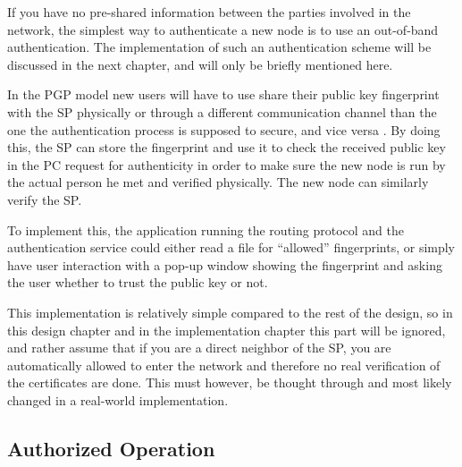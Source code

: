 If you have no pre-shared information between the parties involved in the
network, the simplest way to authenticate a new node is to use an out-of-band
authentication. The implementation of such an authentication scheme will be
discussed in the next chapter, and will only be briefly mentioned here.

In the PGP model new users will have to use share their public key fingerprint
with the \ac{SP} physically or through a different communication channel than
the one the authentication process is supposed to secure, and vice versa
\cite{zimmermann1995official}. By doing this, the \ac{SP} can store the
fingerprint and use it to check the received public key in the \ac{PC} request
for authenticity in order to make sure the new node is run by the actual person
he met and verified physically. The new node can similarly verify the \ac{SP}.

To implement this, the application running the routing protocol and the
authentication service could either read a file for ``allowed'' fingerprints, or
simply have user interaction with a pop-up window showing the fingerprint and
asking the user whether to trust the public key or not.

This implementation is relatively simple compared to the rest of the design, so
in this design chapter and in the implementation chapter this part will be
ignored, and rather assume that if you are a direct neighbor of the \ac{SP}, you
are automatically allowed to enter the network and therefore no real
verification of the certificates are done. This must however, be thought through
and most likely changed in a real-world implementation.

\subsection{Authorized Operation}


